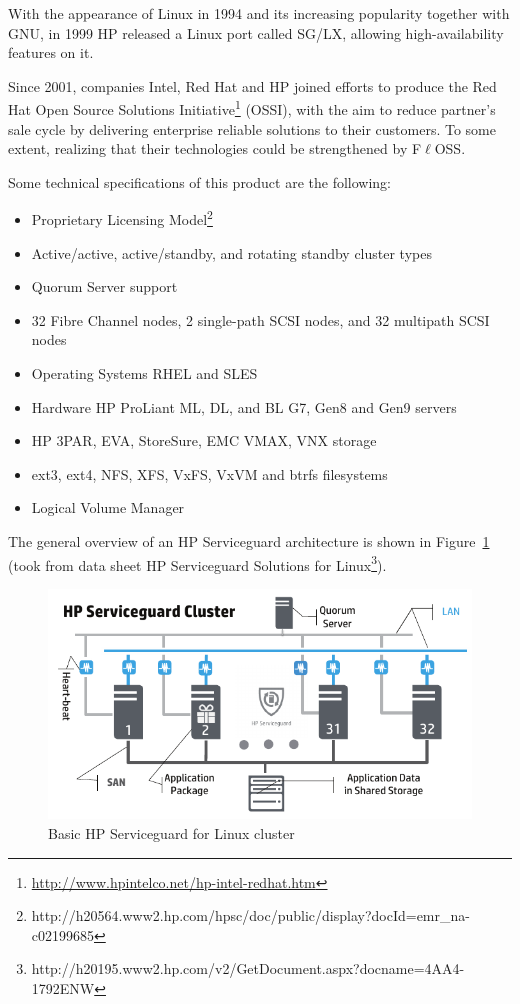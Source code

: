 \documentclass[a4paper, 12pt]{book}
\begin{document}
\noindent With the appearance of Linux in 1994 and its increasing popularity together with GNU, in 1999 HP released a Linux port called SG/LX, allowing high-availability features on it.\bigskip

\noindent Since 2001, companies Intel, Red Hat and HP joined efforts to produce the Red Hat Open Source Solutions Initiative\footnote{\url{http://www.hpintelco.net/hp-intel-redhat.htm}} (OSSI), with the aim to reduce partner's sale cycle by delivering enterprise reliable solutions to their customers. To some extent, realizing that their technologies could be strengthened by F$\ell$OSS.\bigskip

\noindent Some technical specifications of this product are the following:

\begin{itemize}
	\item Proprietary Licensing Model\footnote{http://h20564.www2.hp.com/hpsc/doc/public/display?docId=emr\_na-c02199685}
	\item Active/active, active/standby, and rotating standby cluster types
	\item Quorum Server support
	\item 32 Fibre Channel nodes, 2 single-path SCSI nodes, and 32 multipath SCSI nodes
	\item Operating Systems RHEL and SLES
	\item Hardware HP ProLiant ML, DL, and BL G7, Gen8 and Gen9 servers
	\item HP 3PAR, EVA, StoreSure, EMC VMAX, VNX storage
	\item ext3, ext4, NFS, XFS, VxFS, VxVM and btrfs filesystems
	\item Logical Volume Manager
\end{itemize}

\noindent The general overview of an HP Serviceguard architecture is shown in Figure~\ref{fig:serviceguard} (took from data sheet HP Serviceguard Solutions for Linux\footnote{http://h20195.www2.hp.com/v2/GetDocument.aspx?docname=4AA4-1792ENW}).

\begin{figure}
  \centering
  \includegraphics[scale=0.70]{hp-serviceguard.png}
  \caption[Basic HP Serviceguard for Linux cluster]{Basic HP Serviceguard for Linux cluster}
  \label{fig:serviceguard}
\end{figure}
\end{document}
